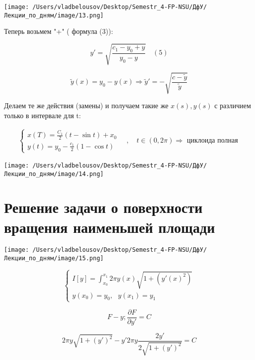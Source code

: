 \documentclass[12pt, a4paper]{report}
\begin{document}
\begin{center}
    \texttt{[image: /Users/vladbelousov/Desktop/Semestr\_4-FP-NSU/ДфУ/Лекции\_по\_дням/image/13.png]}
\end{center}

Теперь возьмем "+" ( формула (3)): 

\[ y ' = \sqrt{\frac{ c_1 - y_0 + y }{y_0 - y } }\quad (5 ) \] 

\[ \tilde{y } (x ) = y_0 - y (x ) \Rightarrow \tilde{y } ' = - \sqrt{\frac{ c- \tilde{ y } }{\tilde{y }}}   \]  

Делаем те же действия (замены) и получаем такие же \( x(s), y ( s ) \) с различием только в интервале для t: 

\[ \begin{aligned}
    \begin{cases}
        x(T)  = \frac{C_1}{ 2 }  ( t- \sin t ) + x_0 \\
        y(t ) = y_0 - \frac{c_1}{2 }  ( 1- \cos  t )            
    \end{cases}
    \quad ,\quad t \in ( 0 , 2 \pi ) \Rightarrow \text{ циклоида полная }  
\end{aligned} \]  

\begin{center}
    \texttt{[image: /Users/vladbelousov/Desktop/Semestr\_4-FP-NSU/ДфУ/Лекции\_по\_дням/image/14.png]}
\end{center}

\newpage

\section{ Решение задачи о поверхности вращения наименьшей площади}

\begin{center}
    \texttt{[image: /Users/vladbelousov/Desktop/Semestr\_4-FP-NSU/ДфУ/Лекции\_по\_дням/image/15.png]}
\end{center}

\[ \begin{cases}
I[ y ] = \int_{x_0}^{x_1} 2 \pi y(x )  \sqrt{1 + (y '(x ) ^2 )} \\ 
y( x_0 ) = y_0 , \text{ }  y ( x_1 ) = y_1 
\end{cases} \] 

\[ F- y; \frac{\partial  F }{\partial   y' } = C   \] 

\[ 2 \pi y \sqrt{ 1 + (y' ) ^2 } - y ' 2 \pi y \frac{2 y '}{ 2 \sqrt{1 + ( y ') ^2 }} = C  \] 
\end{document}
